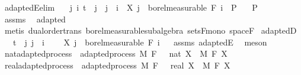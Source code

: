 \begin{isabellebody}
\isanewline
\isanewline
{}\isamarkupfalse%
\ adaptedE{\isacharbrackleft}{\kern0pt}elim{\isacharbrackright}{\kern0pt}{\isacharcolon}{\kern0pt}\isanewline
\ \ \ {\isachardoublequoteopen}{\isasymlbrakk}{\isasymAnd}j\ i{\isachardot}{\kern0pt}\ t\ {\isasymle}\ j\ {\isasymLongrightarrow}\ j\ {\isasymle}\ i\ {\isasymLongrightarrow}\ X\ j\ {\isasymin}\ borel{\isacharunderscore}{\kern0pt}measurable\ {\isacharparenleft}{\kern0pt}F\ i{\isacharparenright}{\kern0pt}{\isasymrbrakk}\ {\isasymLongrightarrow}\ P{\isachardoublequoteclose}\isanewline
\ \ \ P\isanewline
%
\isadelimproof
\ \ %
\endisadelimproof
%
\isatagproof
{}\isamarkupfalse%
\ assms\ \isamarkupfalse%
\ adapted\ \isamarkupfalse%
\ {\isacharparenleft}{\kern0pt}metis\ dual{\isacharunderscore}{\kern0pt}order{\isachardot}{\kern0pt}trans\ borel{\isacharunderscore}{\kern0pt}measurable{\isacharunderscore}{\kern0pt}subalgebra\ sets{\isacharunderscore}{\kern0pt}F{\isacharunderscore}{\kern0pt}mono\ space{\isacharunderscore}{\kern0pt}F{\isacharparenright}{\kern0pt}%
\endisatagproof
{\isafoldproof}%
%
\isadelimproof
\isanewline
%
\endisadelimproof
\isanewline
{}\isamarkupfalse%
\ adaptedD{\isacharcolon}{\kern0pt}\isanewline
\ \ \ {\isachardoublequoteopen}t\ {\isasymle}\ j{\isachardoublequoteclose}\ {\isachardoublequoteopen}j\ {\isasymle}\ i{\isachardoublequoteclose}\ \isanewline
\ \ \ {\isachardoublequoteopen}X\ j\ {\isasymin}\ borel{\isacharunderscore}{\kern0pt}measurable\ {\isacharparenleft}{\kern0pt}F\ i{\isacharparenright}{\kern0pt}{\isachardoublequoteclose}%
\isadelimproof
\ %
\endisadelimproof
%
\isatagproof
{}\isamarkupfalse%
\ assms\ adaptedE\ \isamarkupfalse%
\ meson%
\endisatagproof
{\isafoldproof}%
%
\isadelimproof
%
\endisadelimproof
\isanewline
\isanewline
{}\isamarkupfalse%
\isanewline
\isanewline
{}\isamarkupfalse%
\ nat{\isacharunderscore}{\kern0pt}adapted{\isacharunderscore}{\kern0pt}process\ {\isacharequal}{\kern0pt}\ adapted{\isacharunderscore}{\kern0pt}process\ M\ F\ {\isachardoublequoteopen}{}\ {\isacharcolon}{\kern0pt}{\isacharcolon}{\kern0pt}\ nat{\isachardoublequoteclose}\ X\ \ M\ F\ X\isanewline
{}\isamarkupfalse%
\ real{\isacharunderscore}{\kern0pt}adapted{\isacharunderscore}{\kern0pt}process\ {\isacharequal}{\kern0pt}\ adapted{\isacharunderscore}{\kern0pt}process\ M\ F\ {\isachardoublequoteopen}{}\ {\isacharcolon}{\kern0pt}{\isacharcolon}{\kern0pt}\ real{\isachardoublequoteclose}\ X\ \ M\ F\ X\isanewline

\end{isabellebody}
